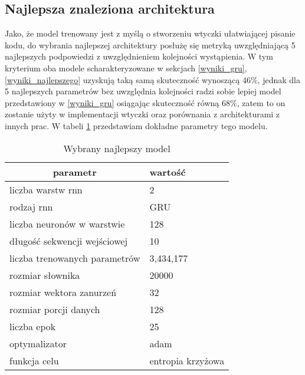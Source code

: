\subsection{Najlepsza znaleziona architektura}
  Jako, że model trenowany jest z myślą o stworzeniu wtyczki ułatwiającej pisanie kodu, do wybrania najlepszej architektury posłużę się 
  metryką uwzględniającą 5 najlepszych podpowiedzi z uwzględnieniem kolejności wystąpienia. W tym kryterium oba modele scharakteryzowane 
  w sekcjach \ref{wyniki_gru}, \ref{wyniki_najlepszego} uzyskują taką samą skuteczność wynoszącą \begin{math}46\%\end{math}, jednak dla 
  5 najlepszych parametrów bez uwzględnia kolejności radzi sobie lepiej model przedstawiony w \ref{wyniki_gru} osiągając skuteczność 
  równą \begin{math}68\%\end{math}, zatem to on zostanie 
  użyty w implementacji wtyczki oraz porównania z architekturami z innych prac. W tabeli \ref{najelpszy} przedstawiam dokładne parametry tego modelu. 
  \begin{table}[ht]
    \centering
    \begin{tabular}{|l|l|}
        \hline
        \multicolumn{1}{|c|}{parametr} & wartość           \\ \hline
        liczba warstw rnn              & 2                 \\ \hline
        rodzaj rnn                     & GRU                \\ \hline
        liczba neuronów w warstwie     & 128               \\ \hline
        długość sekwencji wejściowej   & 10                \\ \hline
        liczba trenowanych parametrów  & 3,434,177         \\ \hline
        rozmiar słownika               & 20000             \\ \hline
        rozmiar wektora zanurzeń       & 32                \\ \hline
        rozmiar porcji danych          & 128               \\ \hline
        liczba epok                    & 25                \\ \hline
        optymalizator                  & adam              \\ \hline
        funkcja celu                   & entropia krzyżowa \\ \hline
        \end{tabular}
    \caption{Wybrany najlepszy model} 

    \label{najelpszy}
\end{table} 


